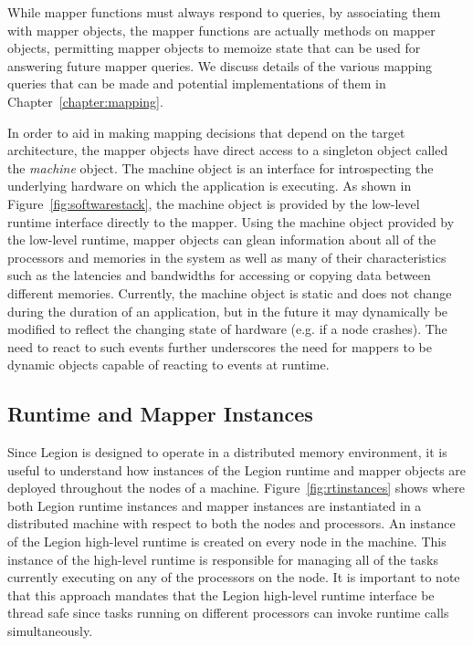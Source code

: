 While mapper functions must always respond to queries, by
associating them with mapper objects, the mapper functions 
are actually methods on mapper objects, permitting mapper
objects to memoize state that can be used for answering
future mapper queries. We discuss details of the various 
mapping queries that can be made and potential 
implementations of them in Chapter~\ref{chapter:mapping}.

In order to aid in making mapping decisions that 
depend on the target architecture, the mapper objects
have direct access to a singleton object called
the {\em machine} object.  The machine object is an
interface for introspecting the underlying hardware
on which the application is executing.  As shown in
Figure~\ref{fig:softwarestack}, the machine object
is provided by the low-level runtime interface directly
to the mapper.  Using the machine object provided by
the low-level runtime, mapper objects can glean 
information about all of the processors and memories
in the system as well as many of their characteristics
such as the latencies and bandwidths for accessing 
or copying data between different memories. Currently,
the machine object is static and does not change
during the duration of an application, but in the
future it may dynamically be modified to reflect the
changing state of hardware (e.g. if a node crashes).
The need to react to such events further underscores
the need for mappers to be dynamic objects capable
of reacting to events at runtime.

\subsection{Runtime and Mapper Instances}
\label{subsec:rtinstances}
Since Legion is designed to operate in a distributed
memory environment, it is useful to understand how 
instances of the Legion runtime and mapper objects 
are deployed throughout the nodes of a machine.  
Figure~\ref{fig:rtinstances} shows where both Legion
runtime instances and mapper instances are instantiated
in a distributed machine with respect to both the
nodes and processors.  An instance of the Legion
high-level runtime is created on every node in the
machine.  This instance of the high-level runtime is
responsible for managing all of the tasks currently
executing on any of the processors on the node. It
is important to note that this approach mandates that
the Legion high-level runtime interface be thread safe 
since tasks running on different processors can invoke 
runtime calls simultaneously.

